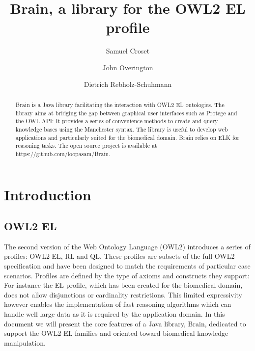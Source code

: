 \documentclass{llncs}
\begin{document}
%
\frontmatter          %
%
\pagestyle{headings}  %

\mainmatter              %
%
\title{Brain, a library for the OWL2 EL profile}
%
\author{Samuel Croset \and John Overington \and Dietrich Rebholz-Schuhmann}

\maketitle              %

\begin{abstract}
Brain is a Java library facilitating the interaction with OWL2 EL ontologies. 
The library aims at bridging the gap between graphical user interfaces such as Protege and the OWL-API: It provides 
a series of convenience methods to create and query knowledge bases using the Manchester syntax. 
The library is useful to develop web applications and particularly suited for the biomedical domain. 
Brain relies on ELK for reasoning tasks. The open source project is available at https://github.com/loopasam/Brain.

\end{abstract}

\section{Introduction}
\subsection{OWL2 EL}
The second version of the Web Ontology Language (OWL2) introduces a series of profiles: OWL2 EL, RL and QL.
These profiles are subsets of the full OWL2 specification and have been designed to match the requirements of particular case scenarios.
Profiles are defined by the type of axioms and constructs they support: For instance the EL profile, which has been 
created for the biomedical domain, does not allow 
disjunctions or cardinality restrictions. This limited expressivity however enables the implementation of fast reasoning algorithms which can
handle well large data as it is required by the application domain. In this document we will present the core features of a 
Java library, Brain, dedicated to support the OWL2 EL families and oriented toward biomedical knowledge manipulation.
\end{document}
